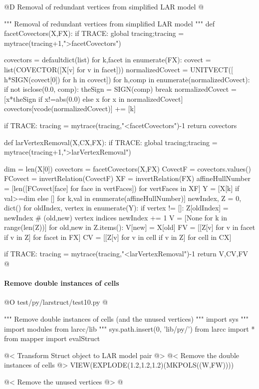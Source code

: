 \documentclass[11pt,oneside]{article}	%
\begin{document}
@D Removal of redundant vertices from simplified LAR model
@{""" Removal of redundant vertices from simplified LAR model """
def facetCovectors(X,FX):
	if TRACE: global tracing;tracing = mytrace(tracing+1,">facetCovectors")

	covectors = defaultdict(list) 
	for k,facet in enumerate(FX):
		covect = list(COVECTOR([X[v] for v in facet]))
		normalizedCovect = UNITVECT([ h*SIGN(covect[0])  for h in covect])
		for h,comp in enumerate(normalizedCovect): 
			if not isclose(0.0, comp): 
				theSign = SIGN(comp)
				break
		normalizedCovect = [x*theSign  if x!=abs(0.0) else x for x in normalizedCovect]
		covectors[vcode(normalizedCovect)] += [k]

	if TRACE: tracing = mytrace(tracing,"<facetCovectors")-1
	return covectors

def larVertexRemoval(X,CX,FX):
	if TRACE: global tracing;tracing = mytrace(tracing+1,">larVertexRemoval")

	dim = len(X[0])
	covectors = facetCovectors(X,FX)
	CovectF = covectors.values()
	FCovect = invertRelation(CovectF)
	XF = invertRelation(FX)
	affineHullNumber = [len([FCovect[face] for face in vertFaces]) for vertFaces in XF]
	Y = [X[k] if val>=dim else [] for k,val in enumerate(affineHullNumber)]
	newIndex, Z = 0, dict()
	for oldIndex, vertex in enumerate(Y):
		if vertex != []:
			Z[oldIndex] = newIndex  # (old,new) vertex indices
			newIndex += 1
	V = [None for k in range(len(Z))]
	for old,new in Z.items():
		V[new] = X[old]
	FV = [[Z[v] for v in facet if v in Z] for facet in FX]
	CV = [[Z[v] for v in cell if v in Z] for cell in CX]

	if TRACE: tracing = mytrace(tracing,"<larVertexRemoval")-1
	return V,CV,FV
@}


\paragraph{Remove double instances of cells}

@O test/py/larstruct/test10.py
@{""" Remove double instances of cells (and the unused vertices) """
import sys
""" import modules from larcc/lib """
sys.path.insert(0, 'lib/py/')
from larcc import *
from mapper import evalStruct

@< Transform Struct object to LAR model pair @>
@< Remove the double instances of cells @>
VIEW(EXPLODE(1.2,1.2,1.2)(MKPOLS((W,FW))))

@< Remove the unused vertices @>
@}
\end{document}
